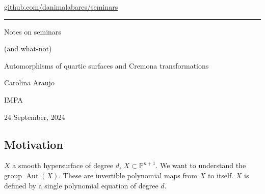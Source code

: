 


\begin{minipage}{\textwidth}
	\begin{minipage}{1\textwidth}
		 \hfill 		
		{\small\hfill\href{https://github.com/danimalabares/seminars}{github.com/danimalabares/seminars}}

		
	\end{minipage}
\end{minipage}\vspace{.2cm}\hrule
\vspace{10pt}
{\Huge Notes on seminars}

{\large (and what-not)}
\tableofcontents

\clearpage
{}
{\Huge Automorphisms of quartic surfaces and Cremona transformations}

\hfill{\Large Carolina Araujo}

{\Large \hfill IMPA}

\hfill{\large 24 September, 2024}
\iffalse
\phantomsection\stepcounter{section}\addcontentsline{toc}{section}{\thesection\quad 
Automorphisms of quartic surfaces and Cremona transformations}\addtocontents{toc}{\hspace{1em}\textit{Carolina Araujo}\par}
{\Huge Automorphisms of quartic surfaces and Cremona transformations}

\hfill{\Large Carolina Araujo}
{\Large \hfill IMPA}

\hfill{\large September 24, 2024}
\fi

\subsection{Motivation}

$X$ a smooth hypersurface of degree $d $, $X\subset \mathbb{P}^{n+1}$. We want to understand the group $\operatorname{Aut}(X)$. These are invertible polynomial maps from $X$ to itself. $X$ is defined by a single polynomial equation of degree $d$.

